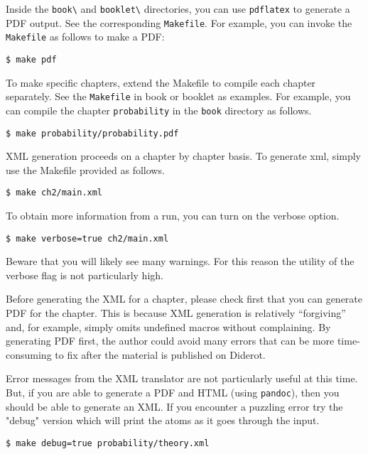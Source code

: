 \begin{gram}
Inside the \lstinline`book\` and \lstinline`booklet\` directories, 
you can use \lstinline`pdflatex` to generate a PDF output.  See the corresponding \lstinline`Makefile`.
%
For example, you can  invoke the \lstinline`Makefile` as follows to make a PDF:
\begin{lstlisting}
$ make pdf
\end{lstlisting}
\end{gram}


\begin{gram}
To make specific chapters,  extend the Makefile to compile each chapter separately.  See the \lstinline`Makefile` in book or booklet as examples.
%
For example, you can compile the chapter \lstinline`probability` in the \lstinline`book` directory as follows.
\begin{lstlisting}
$ make probability/probability.pdf
\end{lstlisting}
\end{gram}


\begin{gram}
XML generation proceeds on a chapter by chapter basis.
%
To generate xml, simply use the Makefile provided as follows.
%
\begin{lstlisting}
$ make ch2/main.xml
\end{lstlisting}
%

To obtain more information from a run, you can turn on the verbose option.
%
\begin{lstlisting}
$ make verbose=true ch2/main.xml
\end{lstlisting}

Beware that you will likely see many warnings.  For this reason the utility of the verbose flag is not particularly high.
\end{gram}

\begin{important}
Before generating the XML for a chapter, please check first that you can generate PDF for the chapter.  This is because XML generation is relatively ``forgiving'' and, for example, simply omits undefined macros without complaining.  By generating PDF first, the author could avoid many errors that can be more time-consuming to fix after the material is published on Diderot.
\end{important}

\begin{gram}
Error messages from the XML translator are not particularly useful at this time.  But, if you are able to generate a PDF and HTML (using \lstinline`pandoc`), then you should be able to generate an XML. 
%
If you encounter a puzzling error try the "debug" version which will print the atoms as it goes through the input.
%
\begin{lstlisting}
$ make debug=true probability/theory.xml
\end{lstlisting}

\end{gram}

